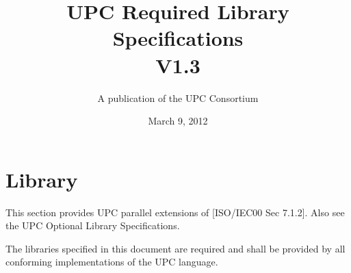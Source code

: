 

\makeindex

\title{UPC Required Library Specifications\\
V1.3 }

\author{A publication of the UPC Consortium}

\date {March 9, 2012}



\maketitle

\setcounter{page}{2}

\setlength {\parskip}{0ex}
\tableofcontents                                             
\setlength {\parskip}{1.3ex}
\newpage

\pagebreak

\setcounter{section}{6} %
\section{Library}

\npf This section provides UPC parallel extensions of [ISO/IEC00 Sec 7.1.2]. Also see the UPC Optional Library Specifications.

\np The libraries specified in this document are required and shall be provided by all conforming implementations of the UPC language.

\setcounter{subsection}{2} %



\pagebreak
\printindex

